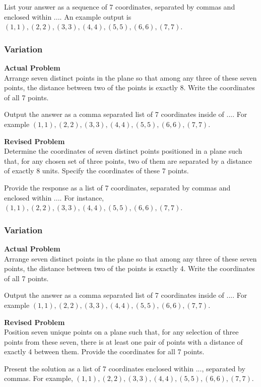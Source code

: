 List your answer as a sequence of 7 coordinates, separated by commas and enclosed within $\boxed{...}$. An example output is $\boxed{(1, 1), (2, 2), (3, 3), (4, 4), (5, 5), (6, 6), (7, 7)}$.

\subsubsection{Variation}
\textbf{Actual Problem}\\
Arrange seven distinct points in the plane so that among any three of these seven points, the distance between two of the points is exactly 8.
Write the coordinates of all 7 points.

Output the answer as a comma separated list of 7 coordinates inside of $\boxed{...}$. For example $\boxed{(1, 1), (2, 2), (3, 3), (4, 4), (5, 5), (6, 6), (7, 7)}$.

\textbf{Revised Problem}\\
Determine the coordinates of seven distinct points positioned in a plane such that, for any chosen set of three points, two of them are separated by a distance of exactly 8 units. Specify the coordinates of these 7 points.

Provide the response as a list of 7 coordinates, separated by commas and enclosed within $\boxed{...}$. For instance, $\boxed{(1, 1), (2, 2), (3, 3), (4, 4), (5, 5), (6, 6), (7, 7)}$.

\subsubsection{Variation}
\textbf{Actual Problem}\\
Arrange seven distinct points in the plane so that among any three of these seven points, the distance between two of the points is exactly 4.
Write the coordinates of all 7 points.

Output the answer as a comma separated list of 7 coordinates inside of $\boxed{...}$. For example $\boxed{(1, 1), (2, 2), (3, 3), (4, 4), (5, 5), (6, 6), (7, 7)}$.

\textbf{Revised Problem}\\
Position seven unique points on a plane such that, for any selection of three points from these seven, there is at least one pair of points with a distance of exactly 4 between them.
Provide the coordinates for all 7 points.

Present the solution as a list of 7 coordinates enclosed within $\boxed{...}$, separated by commas. For example, $\boxed{(1, 1), (2, 2), (3, 3), (4, 4), (5, 5), (6, 6), (7, 7)}$.

